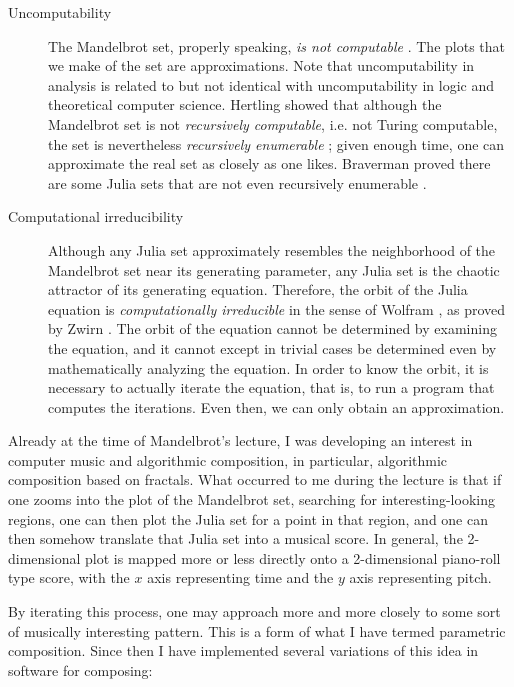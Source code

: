 \documentclass[11pt]{amsart}
\begin{document}
\begin{description}
\item[Uncomputability] The Mandelbrot set, properly speaking, \emph{is not computable} \cite{blum1993godel}. The plots that we make of the set are approximations. Note that uncomputability in analysis is related to but not identical with uncomputability in logic and theoretical computer science. Hertling showed that although the  Mandelbrot set is not \emph{recursively computable}, i.e. not Turing computable, the set is nevertheless \emph{recursively enumerable} \cite{Hertling2005-HERITM-3}; given enough time, one can approximate the real set as closely as one likes. Braverman proved there are some Julia sets that are not even recursively enumerable \cite{braverman2006non, braverman2009computability}.
\item[Computational irreducibility] Although any Julia set approximately resembles the neighborhood of the Mandelbrot set near its generating parameter, any Julia set is the chaotic attractor of its generating equation. Therefore, the orbit of the Julia equation is \emph{computationally irreducible} in the sense of Wolfram \cite{wolfram1985undecidability}, as proved by Zwirn \cite{zwirn2015computational}. The orbit of the equation cannot be determined by examining the equation, and it cannot except in trivial cases be determined even by mathematically analyzing the equation. In order to know the orbit, it is necessary to actually iterate the equation, that is, to run a program that computes the iterations. Even then, we can only obtain an approximation.
\end{description}

Already at the time of Mandelbrot's lecture, I was developing an interest in computer music and algorithmic composition, in particular, algorithmic composition based on fractals. What occurred to me during the lecture is that if one zooms into the plot of the Mandelbrot set, searching for interesting-looking regions, one can then plot the Julia set for a point in that region, and one can then somehow translate that Julia set into a musical score. In general, the 2-dimensional plot is mapped more or less directly onto a 2-dimensional piano-roll type score, with the $x$ axis representing time and the $y$ axis representing pitch.

By iterating this process, one may approach more and more closely to some sort of musically interesting pattern. This is a form of what I have termed parametric composition. Since then I have implemented several variations of this idea in software for composing:
\end{document}
